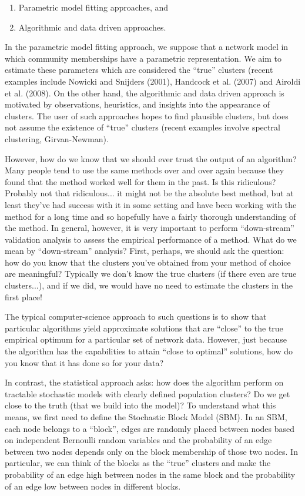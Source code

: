 \begin{enumerate}
\item Parametric model fitting approaches, and 
\item Algorithmic and data driven approaches.
\end{enumerate}

In the parametric model fitting approach, we suppose that a network model in which community memberships have a parametric representation. We aim to estimate these parameters which are considered the ``true'' clusters (recent examples include Nowicki and Snijders (2001), Handcock et al. (2007) and Airoldi et al. (2008). On the other hand, the algorithmic and data driven approach is motivated by observations, heuristics, and insights into the appearance of clusters. The user of such approaches hopes to find plausible clusters, but does not assume the existence of ``true'' clusters (recent examples involve spectral clustering, Girvan-Newman).


However, how do we know that we should ever trust the output of an algorithm? Many people tend to use the same methods over and over again because they found that the method worked well for them in the past. Is this ridiculous? Probably not that ridiculous... it might not be the absolute best method, but at least they've had success with it in some setting and have been working with the method for a long time and so hopefully have a fairly thorough understanding of the method. In general, however, it is very important to perform ``down-stream'' validation analysis to assess the empirical performance of a method. What do we mean by ``down-stream'' analysis? First, perhaps, we should ask the question: how do you know that the clusters you've obtained from your method of choice are meaningful? Typically we don't know the true clusters (if there even are true clusters...), and if we did, we would have no need to estimate the clusters in the first place! 

The typical computer-science approach to such questions is to show that particular algorithms yield approximate solutions that are ``close'' to the true empirical optimum for a particular set of network data. However, just because the algorithm has the capabilities to attain ``close to optimal'' solutions, how do you know that it has done so for your data? 

In contrast, the statistical approach asks: how does the algorithm perform on tractable stochastic models with clearly defined population clusters? Do we get close to the truth (that we build into the model)? To understand what this means, we first need to define the Stochastic Block Model (SBM). In an SBM, each node belongs to a ``block'', edges are randomly placed between nodes based on independent Bernoulli random variables and the probability of an edge between two nodes depends only on the block membership of those two nodes. In particular, we can think of the blocks as the ``true'' clusters and make the probability of an edge high between nodes in the same block and the probability of an edge low between nodes in different blocks. 



